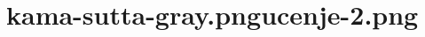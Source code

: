 

\cleartoverso

\vspace*{30mm}

\begin{verse}


\end{verse}


\chapter[D Sutta]{{kama-sutta-gray.png}{ucenje-2.png}}

\begin{verse}



\end{verse}


\clearpage
\begin{verse}


\end{verse}


\clearpage
\begin{verse}


\end{verse}


